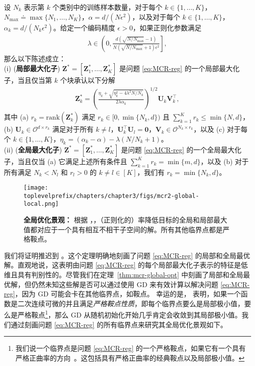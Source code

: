 \documentclass[../../book-main_zh.tex]{subfiles}
\begin{document}
\begin{theorem}[\bf 局部和全局最优解]\label{thm:mcr-global-opt}
	设 $N_k$ 表示第 $k$ 个类别中的训练样本数量，对于每个 $k \in \{1,\dots,K\}$，$N_{\max} \doteq \max\{N_1,\dots,N_K\}$，$\alpha=d/(N\epsilon^2)$，以及对于每个 $k \in \{1,\dots,K\}$，$\alpha_{k} = d/(N_k\epsilon^2)$。给定一个编码精度 $\epsilon > 0$，如果正则化参数满足
	\begin{align}\label{eq:lambda}
		\lambda \in \left(0, \frac{d(\sqrt{N/N_{\max}}-1)}{N(\sqrt{N/N_{\max}}+1)\epsilon^2} \right],
	\end{align}
	那么以下陈述成立：\\
	(i) ({\bf 局部最大化子}) $\bm Z^* = \left[\bm Z_1^*,\dots,\bm Z_K^* \right]$ 是问题 \eqref{eq:MCR-reg} 的一个局部最大化子，当且仅当第 $k$ 个块承认以下分解
	\begin{align}\label{eq:Zk opti}
		\bm Z_k^* = \left(\frac{ \eta_k + \sqrt{\eta_k^2 - 4\lambda^2N/N_k}}{2\lambda \alpha_{k}}\right)^{1/2} \bm U_k \bm V_k^\top,
	\end{align}
	其中 (a) $r_k = \mathrm{rank}(\bm Z_k^*)$ 满足 $r_k \in [0,\min\{N_k,d\})$ 且 $\sum_{k=1}^K r_k \le \min\{N,d\}$，(b) $\bm U_k \in \mathcal{O}^{d \times r_k}$ 满足对于所有 $k \neq l$，$\bm U_k^{\top}\bm U_l = \bm 0$，$\bm V_k \in \mathcal{O}^{N_k \times r_k}$，以及 (c) 对于每个 $k\in \{1,\dots,K\}$，$\eta_k=(\alpha_k-\alpha) - \lambda(N/N_k+1)$。
	\\
	(ii) ({\bf 全局最大化子}) $\bm Z^* = \left[\bm Z_1^*,\dots,\bm Z_K^* \right]$ 是问题 \eqref{eq:MCR-reg} 的一个全局最大化子，当且仅当 (a) 它满足上述所有条件且 $\sum_{k=1}^K r_k = \min\{m,d\}$，以及 (b) 对于所有满足 $N_k < N_l$ 和 $r_l > 0$ 的 $k \neq l \in [K]$，我们有 $r_k = \min\{N_k,d\}$。
\end{theorem}

\begin{figure}[t]
	\centering
	\texttt{[image: \\toplevelprefix/chapters/chapter3/figs/mcr2-global-local.png]}
	\caption{{\bf 全局优化景观：} 根据 \cite{sun2015nonconvex,lee2016gradient}，，（正则化的）率降低目标的全局和局部最大值都对应于一个具有相互不相干子空间的解。所有其他临界点都是严格鞍点。}
	\label{fig:mcr-global-local}
\end{figure}

我们将证明推迟到 \cite{wang2024global}。这个定理明确地刻画了问题 \eqref{eq:MCR-reg} 的局部和全局最优解。直观地说，这表明由问题 \eqref{eq:MCR-reg} 的每个局部最大化子表示的特征是低维且具有判别性的。尽管我们在定理~\ref{thm:mcr-global-opt} 中刻画了局部和全局最优解，但仍然未知这些解是否可以通过使用 GD 来有效计算以解决问题 \eqref{eq:MCR-reg}，因为 GD 可能会卡在其他临界点，如鞍点。
幸运的是，\cite{sun2015nonconvex,lee2016gradient} 表明，如果一个函数是二次连续可微的并且满足{\em 严格鞍点性质}，即每个临界点要么是局部极小值，要么是严格鞍点\footnote{我们说一个临界点是问题 \eqref{eq:MCR-reg} 的一个严格鞍点，如果它有一个具有严格正曲率的方向~\cite{sun2015nonconvex}。这包括具有严格正曲率的经典鞍点以及局部极小值。}，那么 GD 从随机初始化开始几乎肯定会收敛到其局部极小值。我们通过刻画问题 \eqref{eq:MCR-reg} 的所有临界点来研究其全局优化景观如下。
\end{document}
